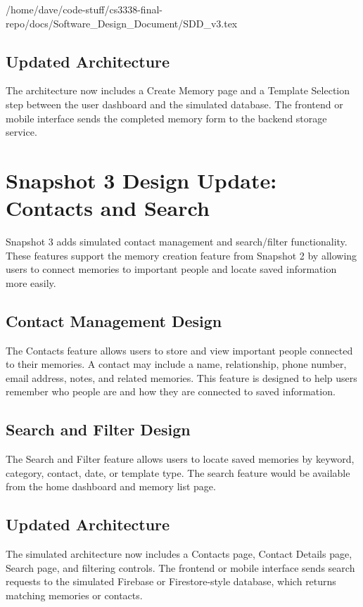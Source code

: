 /home/dave/code-stuff/cs3338-final-repo/docs/Software_Design_Document/SDD_v3.tex\documentclass{article}
\begin{document}
\subsection{Updated Architecture}

The architecture now includes a Create Memory page and a Template Selection step between the user dashboard and the simulated database. The frontend or mobile interface sends the completed memory form to the backend storage service.

\section{Snapshot 3 Design Update: Contacts and Search}

Snapshot 3 adds simulated contact management and search/filter functionality. These features support the memory creation feature from Snapshot 2 by allowing users to connect memories to important people and locate saved information more easily.

\subsection{Contact Management Design}

The Contacts feature allows users to store and view important people connected to their memories. A contact may include a name, relationship, phone number, email address, notes, and related memories. This feature is designed to help users remember who people are and how they are connected to saved information.

\subsection{Search and Filter Design}

The Search and Filter feature allows users to locate saved memories by keyword, category, contact, date, or template type. The search feature would be available from the home dashboard and memory list page.

\subsection{Updated Architecture}

The simulated architecture now includes a Contacts page, Contact Details page, Search page, and filtering controls. The frontend or mobile interface sends search requests to the simulated Firebase or Firestore-style database, which returns matching memories or contacts.
\end{document}
